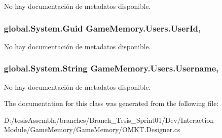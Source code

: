No hay documentación de metadatos disponible. 

\hypertarget{class_game_memory_1_1_users_a719eefec747bdad64f34d721febf4aef}{
\subsubsection[{User\-Id}]{\setlength{\rightskip}{0pt plus 5cm}global.\-System.\-Guid Game\-Memory.\-Users.\-User\-Id\hspace{0.3cm}{\ttfamily [get]}, {\ttfamily [set]}}}\label{class_game_memory_1_1_users_a719eefec747bdad64f34d721febf4aef}


No hay documentación de metadatos disponible. 

\hypertarget{class_game_memory_1_1_users_a679995b1dfe9cb52a344232e32351a57}{
\subsubsection[{Username}]{\setlength{\rightskip}{0pt plus 5cm}global.\-System.\-String Game\-Memory.\-Users.\-Username\hspace{0.3cm}{\ttfamily [get]}, {\ttfamily [set]}}}\label{class_game_memory_1_1_users_a679995b1dfe9cb52a344232e32351a57}


No hay documentación de metadatos disponible. 



The documentation for this class was generated from the following file\-:\begin{DoxyCompactItemize}
\item 
D\-:/tesis\-Assembla/branches/\-Branch\-\_\-\-Tesis\-\_\-\-Sprint01/\-Dev/\-Interaction Module/\-Game\-Memory/\-Game\-Memory/O\-M\-K\-T.\-Designer.\-cs\end{DoxyCompactItemize}
